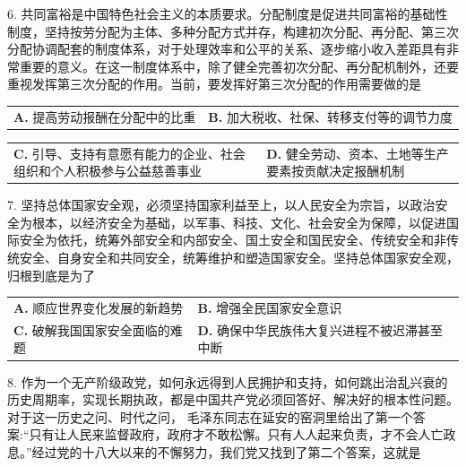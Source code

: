 \documentclass[UTF8,11pt]{ctexart}
\begin{document}
6. 共同富裕是中国特色社会主义的本质要求。分配制度是促进共同富裕的基础性制度，坚持按劳分配为主体、多种分配方式并存，构建初次分配、再分配、第三次分配协调配套的制度体系，对于处理效率和公平的关系、逐步缩小收入差距具有非常重要的意义。在这一制度体系中，除了健全完善初次分配、再分配机制外，还要重视发挥第三次分配的作用。当前，要发挥好第三次分配的作用需要做的是


\begin{center}\begin{tabular}{>{\raggedright\arraybackslash}p{\dimexpr(\linewidth-4\tabcolsep)/2\relax}>{\raggedright\arraybackslash}p{\dimexpr(\linewidth-4\tabcolsep)/2\relax}}
\textbf{A.} 提高劳动报酬在分配中的比重 & \textbf{B.} 加大税收、社保、转移支付等的调节力度\\[.35em]\end{tabular}\end{center}

\begin{center}\begin{tabular}{>{\raggedright\arraybackslash}p{\dimexpr(\linewidth-4\tabcolsep)/2\relax}>{\raggedright\arraybackslash}p{\dimexpr(\linewidth-4\tabcolsep)/2\relax}}
\textbf{C.} 引导、支持有意愿有能力的企业、社会组织和个人积极参与公益慈善事业 & \textbf{D.} 健全劳动、资本、土地等生产要素按贡献决定报酬机制\\[.35em]\end{tabular}\end{center}

7. 坚持总体国家安全观，必须坚持国家利益至上，以人民安全为宗旨，以政治安全为根本，以经济安全为基础，以军事、科技、文化、社会安全为保障，以促进国际安全为依托，统筹外部安全和内部安全、国土安全和国民安全、传统安全和非传统安全、自身安全和共同安全，统筹维护和塑造国家安全。坚持总体国家安全观，归根到底是为了


\begin{center}\begin{tabular}{>{\raggedright\arraybackslash}p{\dimexpr(\linewidth-4\tabcolsep)/2\relax}>{\raggedright\arraybackslash}p{\dimexpr(\linewidth-4\tabcolsep)/2\relax}}
\textbf{A.} 顺应世界变化发展的新趋势 & \textbf{B.} 增强全民国家安全意识\\[.35em]
\textbf{C.} 破解我国国家安全面临的难题 & \textbf{D.} 确保中华民族伟大复兴进程不被迟滞甚至中断\\[.35em]\end{tabular}\end{center}

8. 作为一个无产阶级政党，如何永远得到人民拥护和支持，如何跳出治乱兴衰的历史周期率，实现长期执政，都是中国共产党必须回答好、解决好的根本性问题。对于这一历史之问、时代之问， 毛泽东同志在延安的窑洞里给出了第一个答案:“只有让人民来监督政府，政府才不敢松懈。只有人人起来负责，才不会人亡政息。”经过党的十八大以来的不懈努力，我们党又找到了第二个答案，这就是
\end{document}
